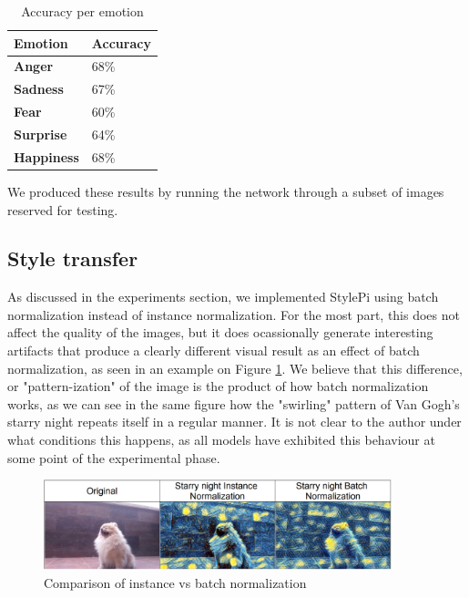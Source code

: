 \begin{table}[h]
    \centering
    \begin{tabular}{ll}
        \hline
        \textbf{Emotion}   & \textbf{Accuracy} \\ \hline
        \textbf{Anger}     & 68\%              \\
        \textbf{Sadness}   & 67\%              \\
        \textbf{Fear}      & 60\%              \\
        \textbf{Surprise}  & 64\%              \\
        \textbf{Happiness} & 68\%              \\ \hline
    \end{tabular}
    \caption{Accuracy per emotion}
    \label{tab:acc_per_emotion}
\end{table}

We produced these results by running the network through a subset of images reserved for testing.

\subsection{Style transfer}


As discussed in the experiments section, we implemented StylePi using batch normalization instead of instance normalization. For the most part, this does not affect the quality of the images, but it does ocassionally generate interesting artifacts that produce a clearly different visual result as an effect of batch normalization, as seen in an example on Figure \ref{fig:style_norm_comp}. We believe that this difference, or "pattern-ization" of the image is the product of how batch normalization works, as we can see in the same figure how the "swirling" pattern of Van Gogh's starry night repeats itself in a regular manner. It is not clear to the author under what conditions this happens, as all models have exhibited this behaviour at some point of the experimental phase.


\begin{figure}[h]
    \centering
    \includegraphics[width = 0.9\textwidth]{resources/style_norm_comp.png}
    \caption{Comparison of instance vs batch normalization}
    \label{fig:style_norm_comp}
\end{figure}


